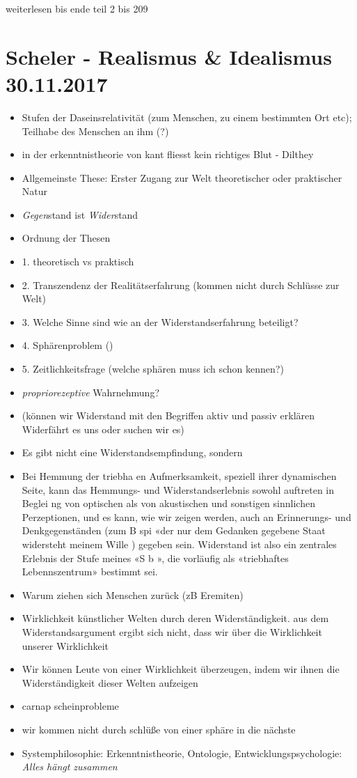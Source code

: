 \documentclass[emulatestandardclasses]{scrartcl}
\begin{document}
weiterlesen bis ende teil 2 bis 209

\section{Scheler - Realismus \& Idealismus\\30.11.2017}

\begin{itemize}
  \item Stufen der Daseinsrelativität (zum Menschen, zu einem bestimmten Ort etc); Teilhabe des Menschen an ihm (?)
  \item in der erkenntnistheorie von kant fliesst kein richtiges Blut - Dilthey
  \item Allgemeinste These: Erster Zugang zur Welt theoretischer oder praktischer Natur 
  \item \emph{Gegen}stand ist \emph{Wider}stand
  \item Ordnung der Thesen
  \item 1. theoretisch vs praktisch
  \item 2. Transzendenz der Realitätserfahrung (kommen nicht durch Schlüsse zur Welt)
  \item 3. Welche Sinne sind wie an der Widerstandserfahrung beteiligt?
  \item 4. Sphärenproblem ()
  \item 5. Zeitlichkeitsfrage (welche sphären muss ich schon kennen?)
  \item \emph{propriorezeptive} Wahrnehmung?
  \item (können wir Widerstand mit den Begriffen aktiv und passiv erklären Widerfährt es uns oder suchen wir es)
  \item 
  
  Es gibt nicht eine Widerstandsempfindung, sondern 
  \item Bei Hemmung der triebha en Aufmerksamkeit, speziell ihrer dynamischen Seite, kann das Hemmungs- und Widerstandserlebnis sowohl auftreten in Beglei ng von optischen als von akustischen und sonstigen sinnlichen Perzeptionen, und
es kann, wie wir zeigen werden, auch an Erinnerungs- und Denkgegenständen (zum B spi  «der nur dem Gedanken gegebene Staat widersteht meinem Wille ) gegeben sein. Widerstand ist also ein zentrales Erlebnis der Stufe meines «S b », die vorläufig als «triebhaftes Lebennszentrum» bestimmt sei.
\item Warum ziehen sich Menschen zurück (zB Eremiten)
\item Wirklichkeit künstlicher Welten durch deren Widerständigkeit. aus dem Widerstandsargument ergibt sich nicht, dass wir über die Wirklichkeit unserer Wirklichkeit
\item Wir können Leute von einer Wirklichkeit überzeugen, indem wir ihnen die Widerständigkeit dieser Welten aufzeigen
\item carnap scheinprobleme
\item wir kommen nicht durch schlüße von einer sphäre in die nächste
\item Systemphilosophie: Erkenntnistheorie, Ontologie, Entwicklungspsychologie: \emph{Alles hängt zusammen}
\end{itemize}
\end{document}
